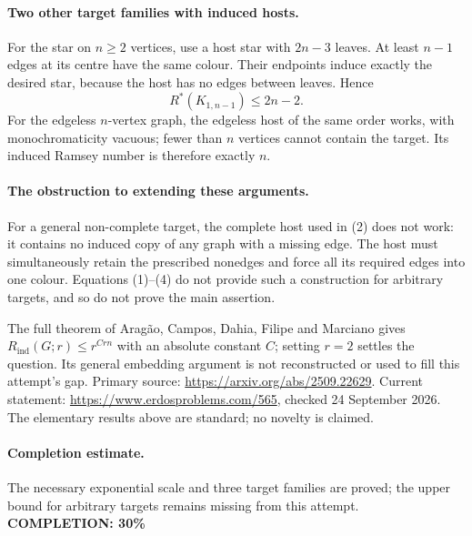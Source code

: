 \paragraph{Two other target families with induced hosts.}
For the star on \(n\geq2\) vertices, use a host star with
\(2n-3\) leaves. At least \(n-1\) edges at its centre have the
same colour. Their endpoints induce exactly the desired star,
because the host has no edges between leaves. Hence
\[
 R^*(K_{1,n-1})\leq2n-2. \tag{4}
\]
For the edgeless \(n\)-vertex graph, the edgeless host of the same
order works, with monochromaticity vacuous; fewer than \(n\)
vertices cannot contain the target. Its induced Ramsey number is
therefore exactly \(n\).

\paragraph{The obstruction to extending these arguments.}
For a general non-complete target, the complete host used in (2)
does not work: it contains no induced copy of any graph with a
missing edge. The host must simultaneously retain the prescribed
nonedges and force all its required edges into one colour.
Equations (1)--(4) do not provide such a construction for arbitrary
targets, and so do not prove the main assertion.

The full theorem of Arag\~ao, Campos, Dahia, Filipe and Marciano
gives \(R_{\mathrm{ind}}(G;r)\leq r^{Crn}\) with an absolute
constant \(C\); setting \(r=2\) settles the question.
Its general embedding argument is not reconstructed or used to
fill this attempt's gap. Primary source:
\url{https://arxiv.org/abs/2509.22629}.
Current statement: \url{https://www.erdosproblems.com/565},
checked 24 September 2026. The elementary results above are standard;
no novelty is claimed.

\paragraph{Completion estimate.}
The necessary exponential scale and three target families are proved;
the upper bound for arbitrary targets remains missing from this attempt.
\textbf{COMPLETION: 30\%}
